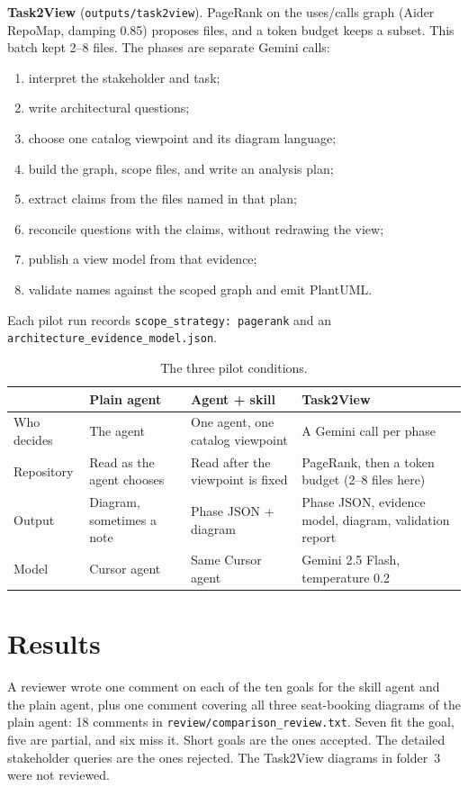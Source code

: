 \documentclass[11pt]{article}
\begin{document}
\noindent\textbf{Task2View} (\texttt{outputs/task2view}).
PageRank on the uses/calls graph (Aider RepoMap, damping 0.85) proposes files, and a token budget keeps a subset. This batch kept 2--8 files. The phases are separate Gemini calls:
\begin{enumerate}
\item interpret the stakeholder and task;
\item write architectural questions;
\item choose one catalog viewpoint and its diagram language;
\item build the graph, scope files, and write an analysis plan;
\item extract claims from the files named in that plan;
\item reconcile questions with the claims, without redrawing the view;
\item publish a view model from that evidence;
\item validate names against the scoped graph and emit PlantUML.
\end{enumerate}
Each pilot run records \texttt{scope\_strategy: pagerank} and an \texttt{architecture\_evidence\_model.json}.

\begin{table}[h]
\centering
\small
\begin{tabularx}{\textwidth}{@{}lYYY@{}}
\toprule
 & Plain agent & Agent + skill & Task2View \\
\midrule
Who decides & The agent & One agent, one catalog viewpoint & A Gemini call per phase \\
Repository & Read as the agent chooses & Read after the viewpoint is fixed & PageRank, then a token budget (2--8 files here) \\
Output & Diagram, sometimes a note & Phase JSON + diagram & Phase JSON, evidence model, diagram, validation report \\
Model & Cursor agent & Same Cursor agent & Gemini 2.5 Flash, temperature 0.2 \\
\bottomrule
\end{tabularx}
\caption{The three pilot conditions.}
\label{tab:conditions}
\end{table}

\section{Results}
\label{sec:results}
A reviewer wrote one comment on each of the ten goals for the skill agent and the plain agent, plus one comment covering all three seat-booking diagrams of the plain agent: 18 comments in \texttt{review/comparison\_review.txt}. Seven fit the goal, five are partial, and six miss it. Short goals are the ones accepted. The detailed stakeholder queries are the ones rejected. The Task2View diagrams in folder~3 were not reviewed.
\end{document}
